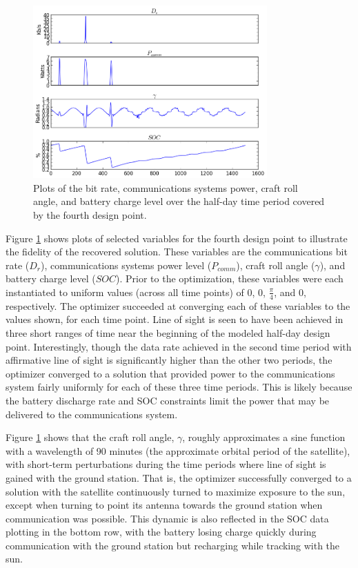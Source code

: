 \documentclass[]{aiaa-tc} %
\begin{document}
        \begin{figure}[!htb]
        \centering
        \includegraphics[width=0.8\textwidth]{images/pt_3_data}
        \caption[width=0.4\textwidth]{Plots of the bit rate, communications systems power, craft roll angle,
        and battery charge level over the half-day time period covered by the fourth design point.
        \label{pt3_data_results}
        }
        \end{figure}

        Figure \ref{pt3_data_results} shows plots of selected variables for the fourth design point
        to illustrate the fidelity of the recovered solution. These variables are the communications
        bit rate ($D_r$), communications systems power level ($P_{comm}$), craft roll angle ($\gamma$),
        and battery charge level ($SOC$). Prior to the optimization, these variables
        were each instantiated to uniform values
        (across all time points) of 0, 0, $\frac{\pi}{4}$, and 0, respectively. The optimizer succeeded at converging each of these variables to the values
        shown, for each time point. Line of sight is seen to have been achieved in three short ranges of time near the
        beginning of the modeled half-day design point. Interestingly, though the data rate achieved in the second
        time period with affirmative line of sight is significantly higher than the other two periods, the optimizer
        converged to a solution that provided power to the communications system fairly uniformly for each of these
        three time periods. This is likely because the battery discharge rate and SOC constraints limit
        the power that may be delivered to the communications system.

        Figure \ref{pt3_data_results} shows that the craft roll angle, $\gamma$, roughly approximates a sine function
        with a wavelength of 90 minutes (the approximate orbital period of the satellite),
        with short-term perturbations during the time
        periods where line of sight is gained with the ground station. That is, the optimizer successfully
        converged to a solution with the satellite continuously turned to maximize exposure to the sun,
        except when turning to point its antenna towards the ground station when
        communication was possible. This dynamic is also reflected in the SOC
        data plotting in the bottom row, with the battery losing charge quickly during
        communication with the ground station but recharging while tracking with the sun.
\end{document}

